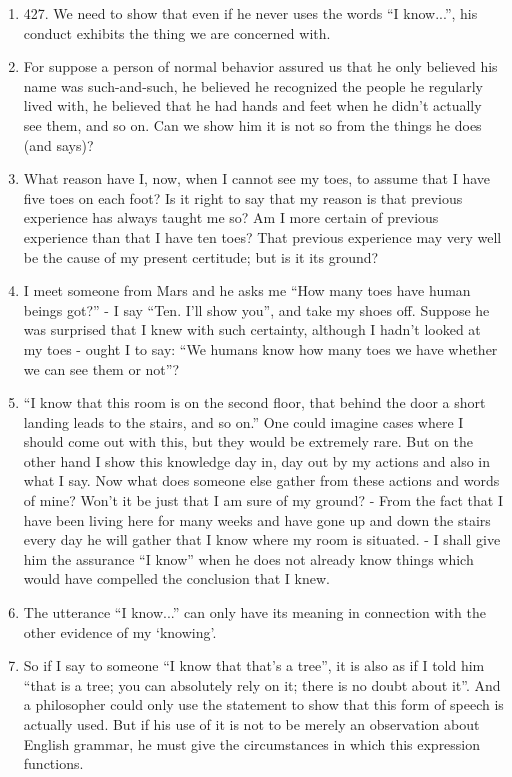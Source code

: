 \documentclass{book}
\begin{document}
\begin{enumerate}
\item

427. We need to show that even if he never uses the words ``I know...'', his
conduct exhibits the thing we are concerned with.

\item
For suppose a person of normal behavior assured us that he only believed his
name was such-and-such, he believed he recognized the people he regularly lived
with, he believed that he had hands and feet when he didn't actually see them,
and so on. Can we show him it is not so from the things he does (and says)?

\item
What reason have I, now, when I cannot see my toes, to assume that I have five
toes on each foot?  Is it right to say that my reason is that previous
experience has always taught me so? Am I more certain of previous experience
than that I have ten toes?  That previous experience may very well be the cause
of my present certitude; but is it its ground?

\item
I meet someone from Mars and he asks me ``How many toes have human beings
got?'' - I say ``Ten. I'll show you'', and take my shoes off. Suppose he was
surprised that I knew with such certainty, although I hadn't looked at my toes
- ought I to say: ``We humans know how many toes we have whether we can see
them or not''?

\item
``I know that this room is on the second floor, that behind the door a short
landing leads to the stairs, and so on.'' One could imagine cases where I
should come out with this, but they would be extremely rare. But on the other
hand I show this knowledge day in, day out by my actions and also in what I
say.  Now what does someone else gather from these actions and words of mine?
Won't it be just that I am sure of my ground? - From the fact that I have been
living here for many weeks and have gone up and down the stairs every day he
will gather that I know where my room is situated. - I shall give him the
assurance ``I know'' when he does not already know things which would have
compelled the conclusion that I knew.

\item
The utterance ``I know...'' can only have its meaning in connection with the
other evidence of my `knowing'.

\item
So if I say to someone ``I know that that's a tree'', it is also as if I told
him ``that is a tree; you can absolutely rely on it; there is no doubt about
it''. And a philosopher could only use the statement to show that this form of
speech is actually used. But if his use of it is not to be merely an
observation about English grammar, he must give the circumstances in which this
expression functions.


\end{enumerate}
\end{document}
